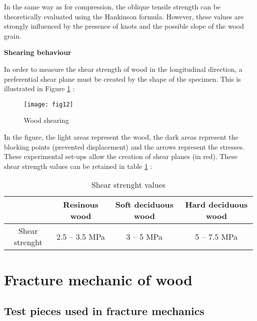 In the same way as for compression, the oblique tensile strength can be theoretically evaluated using the Hankinson formula. However, these values are strongly influenced by the presence of knots and the possible slope of the wood grain.

\smallskip

\textbf{Shearing behaviour}

In order to measure the shear strength of wood in the longitudinal direction, a preferential shear plane must be created by the shape of the specimen. This is illustrated in Figure \ref{fig:fig12} :


\begin{figure}[htp]
	\centering
	\texttt{[image: fig12]}
	\caption{Wood shearing}
	\label{fig:fig12}
\end{figure}

In the figure, the light areas represent the wood, the dark areas represent the blocking points (prevented displacement) and the arrows represent the stresses. These experimental set-ups allow the creation of shear planes (in red). These shear strength values can be retained in table \ref{fig:fig13} :


\begin{table} \centering
\begin{tabular}{cccc}
	\toprule %
	& Resinous wood & Soft deciduous wood & Hard deciduous wood \\\midrule
Shear strenght & 2.5 -- 3.5 \unit{\mega\pascal}
	& 3 -- 5 \unit{\mega\pascal} & 5 -- 7.5 \unit{\mega\pascal}\\
	  \bottomrule %
\end{tabular}
	\caption{Shear strenght values}
	\label{fig:fig13}
\end{table}

%


\section{Fracture mechanic of wood}

\subsection{Test pieces used in fracture mechanics}

